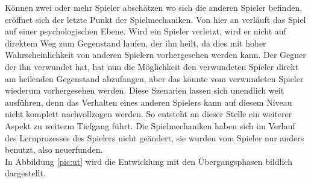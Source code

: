 \begin{description}
Können zwei oder mehr Spieler abschätzen wo sich die anderen Spieler befinden, eröffnet sich der letzte Punkt der Spielmechaniken. Von hier an verläuft das Spiel auf einer psychologischen Ebene. Wird ein Spieler verletzt, wird er nicht auf direktem Weg zum Gegenstand laufen, der ihn heilt, da dies mit hoher Wahrscheinlichkeit von anderen Spielern vorhergesehen werden kann. Der Gegner der ihn verwundet hat, hat nun die Möglichkeit den verwundeten Spieler direkt am heilenden Gegenstand abzufangen, aber das könnte vom verwundeten Spieler wiederum vorhergesehen werden. Diese Szenarien lassen sich unendlich weit ausführen, denn das Verhalten eines anderen Spielers kann auf diesem Niveau nicht komplett nachvollzogen werden. So entsteht an dieser Stelle ein weiterer Aspekt zu weiterm Tiefgang führt. Die Spielmechaniken haben sich im Verlauf des Lernprozesses des Spielers nicht geändert, sie wurden vom Spieler nur anders benutzt, also neuerfunden.\cite[S. 69]{Adams:1515529}\\
In Abbildung \ref{pic:ut} wird die Entwicklung mit den Übergangsphasen bildlich dargestellt. 

\end{description}
